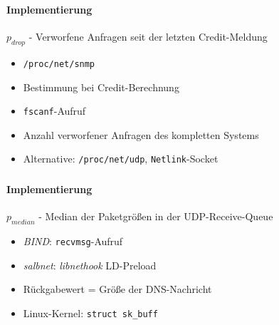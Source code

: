 \documentclass{beamer}
\begin{document}
    \begin{frame}[containsverbatim]
        \frametitle{\mytitle}
        \framesubtitle{Implementierung}
        $p_{drop}$ - Verworfene Anfragen seit der letzten Credit-Meldung
        \vspace{10pt}\par
        \begin{itemize}
            \item \texttt{/proc/net/snmp}
            \item Bestimmung bei Credit-Berechnung
            \item \texttt{fscanf}-Aufruf
            \item Anzahl verworfener Anfragen des kompletten Systems
            \item Alternative: \texttt{/proc/net/udp}, \texttt{Netlink}-Socket
        \end{itemize}
        \vspace{20pt}\par
		
    \end{frame}

    \begin{frame}[containsverbatim]
        \frametitle{\mytitle}
        \framesubtitle{Implementierung}
        $p_{median}$ - Median der Paketgrößen in der UDP-Receive-Queue
        \vspace{10pt}\par
        \begin{itemize}
            \item \textit{BIND}: \texttt{recvmsg}-Aufruf
            \item \textit{salbnet}: \textit{libnethook} LD-Preload
            \item Rückgabewert = Größe der DNS-Nachricht
            \item Linux-Kernel: \texttt{struct sk\_buff}
        \end{itemize}
        \vspace{20pt}\par
		
    \end{frame}

    
\end{document}
